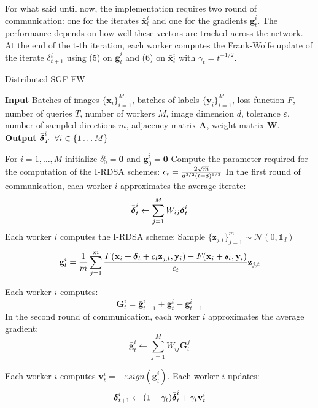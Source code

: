 For what said until now, the implementation requires two round of communication: one for the iterates $\bar{\mathbf{x}}_t^i$ and one for the gradients $\bar{\mathbf{g}}_t^i$. The performance depends on how well these vectors are tracked across the network.\\
At the end of the t-th iteration, each worker computes the Frank-Wolfe update of the iterate \mbox{\boldmath$ \delta$}$_{t+1}^i$ using (5) on $\bar{\mathbf{g}}_t^i$ and (6) on $\bar{\mathbf{x}}_t^i$ with $\gamma_t = t^{-1/2}$.\\
\begin{algorithm}
	\caption{Distributed SGF FW}\label{distributed}
	\textbf{Input} Batches of images $\{\mathbf{x}_i\}_{i=1}^M$, batches of labels $\{\mathbf{y}_i\}_{i=1}^M$, loss function $F$, number of queries $T$, number of workers $M$, image dimension $d$, tolerance $\varepsilon$, number of sampled directions $m$, adjacency matrix $\mathbf{A}$, weight matrix $\mathbf{W}$.\\
	\textbf{Output} $\bar{\mbox{\boldmath$ \delta$}}_T^i\;\;\forall i \in \{1\dots M\}$
	\begin{algorithmic}[1]		
		\State For $i=1,\dots, M$ initialize \mbox{\boldmath$ \delta$}$_0^i =\mathbf{0} $ and $\bar{\mathbf{g}}_0^i = \mathbf{0}$
		\State Compute the parameter required for the computation of the I-RDSA schemes: 
		${\scriptsize c_t =\frac{2\sqrt{m}}{d^{3/2}(t+8)^{1/3}}}$
		\State In the first round of communication, each worker $i$ approximates the average iterate: \newline
		\[\bar{\mbox{\boldmath$ \delta$}}_t^i \leftarrow \sum_{j=1}^{M} W_{ij}\mbox{\boldmath$ \delta$}_t^i\]
		\State Each worker $i$ computes the I-RDSA scheme:\newline 
		Sample $\{\mathbf{z}_{j,t}\}_{j=1}^m \sim\mathcal{N}(0,\mathbb{1}_d)$ \newline
		\[\mathbf{g}_t^i = \frac{1}{m} \sum_{j=1}^{m} \frac{F(\mathbf{x}_i + \mbox{\boldmath$ \delta$}_t + c_t\mathbf{z}_{j,t}, \mathbf{y}_i) - F(\mathbf{x}_i + \mbox{\scriptsize\boldmath$ \delta$}_t, \mathbf{y}_i)}{c_t}\mathbf{z}_{j,t}\]
		
		\State  Each worker $i$ computes:
		\[ \mathbf{G}_t^i = \bar{\mathbf{g}}_{t-1}^i + \mathbf{g}_t^i - \mathbf{g}_{t-1}^i \]
		\State In the second round of communication, each worker $i$ approximates the average gradient:
		\[ \bar{\mathbf{g}}_t^i \leftarrow \sum_{j=1}^{M} W_{ij}\mathbf{G}_t^j  \]
		
		\State Each worker $i$ computes $\mathbf{v}_t^i = - \varepsilon sign(\bar{\mathbf{g}}^i_t)$.
		\State Each worker $i$ updates:
		\[\mbox{\boldmath$ \delta$}_{t+1}^i \leftarrow (1-\gamma_t)\bar{\mbox{\boldmath$ \delta$}}_t^i + \gamma_t\mathbf{v}_t^i\]
		\EndFor
		
	\end{algorithmic}
\end{algorithm}